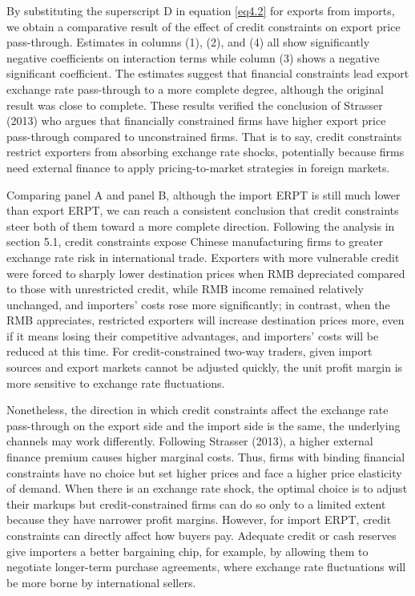 By substituting the superscript D in equation \ref{eq4.2} for exports from imports, we obtain a comparative result of the effect of credit constraints on export price pass-through. Estimates in columns (1), (2), and (4) all show significantly negative coefficients on interaction terms while column (3) shows a negative significant coefficient. The estimates suggest that financial constraints lead export exchange rate pass-through to a more complete degree, although the original result was close to complete. These results verified the conclusion of Strasser (2013)\cite{strasser2013} who argues that financially constrained firms have higher export price pass-through compared to unconstrained firms. That is to say, credit constraints restrict exporters from absorbing exchange rate shocks, potentially because firms need external finance to apply pricing-to-market strategies in foreign markets.

Comparing panel A and panel B, although the import ERPT is still much lower than export ERPT, we can reach a consistent conclusion that credit constraints steer both of them toward a more complete direction. Following the analysis in section 5.1, credit constraints expose Chinese manufacturing firms to greater exchange rate risk in international trade. Exporters with more vulnerable credit were forced to sharply lower destination prices when RMB depreciated compared to those with unrestricted credit, while RMB income remained relatively unchanged, and importers’ costs rose more significantly; in contrast, when the RMB appreciates, restricted exporters will increase destination prices more, even if it means losing their competitive advantages, and importers' costs will be reduced at this time. For credit-constrained two-way traders, given import sources and export markets cannot be adjusted quickly, the unit profit margin is more sensitive to exchange rate fluctuations.

Nonetheless, the direction in which credit constraints affect the exchange rate pass-through on the export side and the import side is the same, the underlying channels may work differently. Following Strasser (2013)\cite{strasser2013}, a higher external finance premium causes higher marginal costs. Thus, firms with binding financial constraints have no choice but set higher prices and face a higher price elasticity of demand. When there is an exchange rate shock, the optimal choice is to adjust their markups but credit-constrained firms can do so only to a limited extent because they have narrower profit margins. However, for import ERPT, credit constraints can directly affect how buyers pay. Adequate credit or cash reserves give importers a better bargaining chip, for example, by allowing them to negotiate longer-term purchase agreements, where exchange rate fluctuations will be more borne by international sellers.


